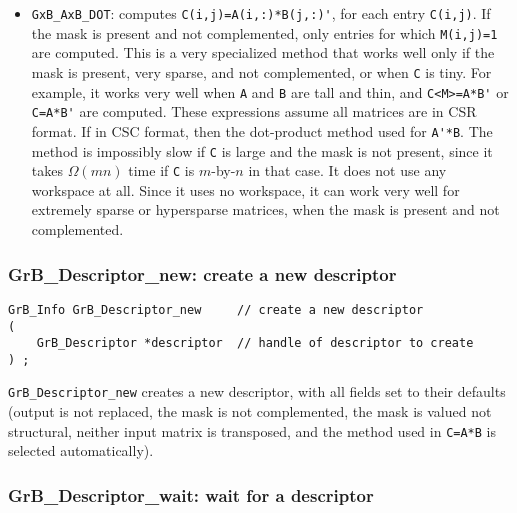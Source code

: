 \documentclass[12pt]{article}
\begin{document}
\begin{itemize}
\begin{itemize}
    \item \verb'GxB_AxB_DOT': computes \verb"C(i,j)=A(i,:)*B(j,:)'", for each
    entry \verb'C(i,j)'.  If the mask is present and not complemented, only
    entries for which \verb'M(i,j)=1' are computed.  This is a very specialized
    method that works well only if the mask is present, very sparse, and not
    complemented, or when \verb'C' is tiny.  For example, it works very well
    when \verb'A' and \verb'B' are tall and thin, and \verb"C<M>=A*B'" or
    \verb"C=A*B'" are computed.  These expressions assume all matrices are in
    CSR format.  If in CSC format, then the dot-product method used for
    \verb"A'*B".  The method is impossibly slow if \verb'C' is large and the
    mask is not present, since it takes $\Omega(mn)$ time if \verb'C' is
    $m$-by-$n$ in that case.  It does not use any workspace at all.  Since it
    uses no workspace, it can work very well for extremely sparse or
    hypersparse matrices, when the mask is present and not complemented.

    \end{itemize}

\end{itemize}

\newpage
\subsubsection{{\sf GrB\_Descriptor\_new:}  create a new descriptor}
\label{descriptor_new}

\begin{mdframed}[userdefinedwidth=6in]
{\footnotesize
\begin{verbatim}
GrB_Info GrB_Descriptor_new     // create a new descriptor
(
    GrB_Descriptor *descriptor  // handle of descriptor to create
) ;
\end{verbatim} } \end{mdframed}

\verb'GrB_Descriptor_new' creates a new descriptor, with all fields set to
their defaults (output is not replaced, the mask is not complemented, the mask
is valued not structural, neither input matrix is transposed, and the method
used in \verb'C=A*B' is selected automatically).

\subsubsection{{\sf GrB\_Descriptor\_wait:} wait for a descriptor}
\end{document}

